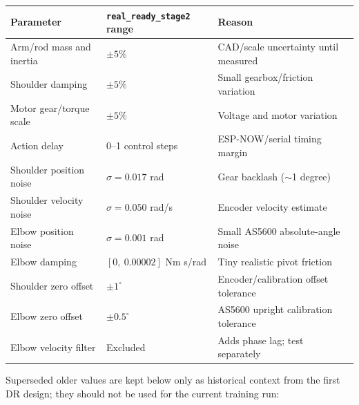 \documentclass[12pt,a4paper]{article}
\begin{document}
\begin{center}
\begin{tabular}{lll}
\toprule
\textbf{Parameter} & \textbf{\texttt{real\_ready\_stage2} range} & \textbf{Reason} \\
\midrule
Arm/rod mass and inertia & $\pm5\%$ & CAD/scale uncertainty until measured \\
Shoulder damping         & $\pm5\%$ & Small gearbox/friction variation \\
Motor gear/torque scale  & $\pm5\%$ & Voltage and motor variation \\
Action delay             & 0--1 control steps & ESP-NOW/serial timing margin \\
Shoulder position noise  & $\sigma = 0.017$ rad & Gear backlash ($\sim$1 degree) \\
Shoulder velocity noise  & $\sigma = 0.050$ rad/s & Encoder velocity estimate \\
Elbow position noise     & $\sigma = 0.001$ rad & Small AS5600 absolute-angle noise \\
Elbow damping            & $[0,\ 0.00002]$ Nm s/rad & Tiny realistic pivot friction \\
Shoulder zero offset     & $\pm1^\circ$ & Encoder/calibration offset tolerance \\
Elbow zero offset        & $\pm0.5^\circ$ & AS5600 upright calibration tolerance \\
Elbow velocity filter    & Excluded & Adds phase lag; test separately \\
\bottomrule
\end{tabular}
\end{center}

\noindent Superseded older values are kept below only as historical context
from the first DR design; they should not be used for the current training run:
\end{document}
